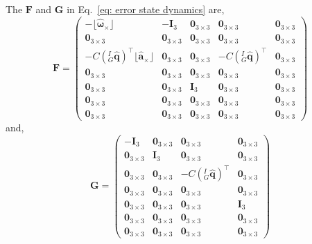 \section{}
\label{sec: error state dynamics}
The $\mathbf{F}$ and $\mathbf{G}$ in Eq.~\eqref{eq: error state dynamics} are,
\begin{equation*}
\mathbf{F} = 
\begin{pmatrix}
-\lfloor\hat{\bm{\omega}}{}_{\times}\rfloor & -\mathbf{I}_3 & 
\mathbf{0}_{3\times 3} & \mathbf{0}_{3\times 3} & \mathbf{0}_{3\times 3} \\
\mathbf{0}_{3\times 3} & \mathbf{0}_{3\times 3} & \mathbf{0}_{3\times 3} & 
\mathbf{0}_{3\times 3} & \mathbf{0}_{3\times 3} \\
-C\left({}^I_G\hat{\mathbf{q}}\right)^\top\lfloor\hat{\mathbf{a}}{}_{\times}\rfloor & 
\mathbf{0}_{3\times 3} & \mathbf{0}_{3\times 3} & 
-C\left({}^I_G\hat{\mathbf{q}}\right)^\top & \mathbf{0}_{3\times 3} \\
\mathbf{0}_{3\times 3} & \mathbf{0}_{3\times 3} & \mathbf{0}_{3\times 3} & 
\mathbf{0}_{3\times 3} & \mathbf{0}_{3\times 3} \\
\mathbf{0}_{3\times 3} & \mathbf{0}_{3\times 3} & \mathbf{I}_3 & 
\mathbf{0}_{3\times 3} & \mathbf{0}_{3\times 3} \\
\mathbf{0}_{3\times 3} & \mathbf{0}_{3\times 3} & \mathbf{0}_{3\times 3} & 
\mathbf{0}_{3\times 3} & \mathbf{0}_{3\times 3} \\
\mathbf{0}_{3\times 3} & \mathbf{0}_{3\times 3} & \mathbf{0}_{3\times 3} & 
\mathbf{0}_{3\times 3} & \mathbf{0}_{3\times 3}
\end{pmatrix}
\end{equation*}
and, 
\begin{equation*}
\mathbf{G} = 
\begin{pmatrix}
-\mathbf{I}_3 & \mathbf{0}_{3\times 3} & 
\mathbf{0}_{3\times 3} & \mathbf{0}_{3\times 3} \\
\mathbf{0}_{3\times 3} & \mathbf{I}_3 & 
\mathbf{0}_{3\times 3} & \mathbf{0}_{3\times 3} \\
\mathbf{0}_{3\times 3} & \mathbf{0}_{3\times 3} & 
-C\left({}^I_G\hat{\mathbf{q}}\right)^\top & \mathbf{0}_{3\times 3} \\
\mathbf{0}_{3\times 3} & \mathbf{0}_{3\times 3} & 
\mathbf{0}_{3\times 3} & \mathbf{0}_{3\times 3} \\
\mathbf{0}_{3\times 3} & \mathbf{0}_{3\times 3} & 
\mathbf{0}_{3\times 3} & \mathbf{I}_3 \\
\mathbf{0}_{3\times 3} & \mathbf{0}_{3\times 3} & 
\mathbf{0}_{3\times 3} & \mathbf{0}_{3\times 3} \\
\mathbf{0}_{3\times 3} & \mathbf{0}_{3\times 3} & 
\mathbf{0}_{3\times 3} & \mathbf{0}_{3\times 3}
\end{pmatrix}
\end{equation*}

